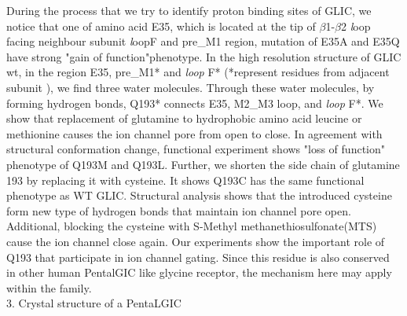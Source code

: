 \documentclass[12pt,a4paper,]{article}
\begin{document}
 During the process that we try to identify proton binding sites of GLIC, we notice that one  of amino acid E35, which is located at the tip of $\beta$1-$\beta$2 {\textsl loop} facing neighbour subunit {\textsl loop}F and pre\_M1 region, mutation of  E35A and E35Q have strong "gain of function"phenotype. 
 In the high resolution structure of GLIC wt, in the region E35, pre\_M1* and \textsl{loop} F* (*represent residues from adjacent subunit ), we find three water molecules. Through these water molecules, by forming hydrogen bonds, Q193* connects E35, M2\_M3 loop,  and \textsl{loop} F*. We show that replacement of glutamine to hydrophobic amino acid leucine or  methionine causes the ion channel pore from open to close. In agreement with structural conformation change, functional experiment shows "loss of function" phenotype of Q193M and Q193L. Further, we shorten the side chain  of glutamine 193 by replacing it with cysteine. It shows Q193C has the same functional phenotype as WT GLIC. Structural analysis shows that the introduced cysteine form new type of hydrogen bonds that maintain ion channel pore open. Additional, blocking the cysteine with S-Methyl methanethiosulfonate(MTS) cause the ion channel close again. Our experiments show the important role of Q193 that participate in ion channel gating. Since this residue is also conserved in other human PentalGIC like glycine receptor, the mechanism here may apply within the family. \\
 
 
 {\large 3. Crystal structure of a PentaLGIC }\\	
 
\end{document}
